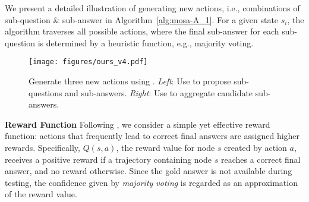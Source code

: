 We present a detailed illustration of generating new actions, i.e., combinations of sub-question \& sub-answer in Algorithm~\ref{alg:mosa-A_1}.
For a given state $s_i$,  the algorithm traverses all possible actions, where the final sub-answer for each sub-question is determined by a heuristic function, e.g., majority voting. 




\begin{figure*}[t]
\begin{center}
\centerline{\texttt{[image: figures/ours\_v4.pdf]}}
\caption{
Generate three new actions using \mosa. \emph{Left}: Use \mosa{} to propose sub-questions and sub-answers. \emph{Right}: Use \mosa{} to aggregate candidate sub-answers.
}
\label{fig:ours}
\end{center}
\vskip -0.2in
\end{figure*}





\textbf{Reward Function}
\hspace{5pt}
Following \citet{hao-etal-2023-reasoning,qi2024mutual}, we consider a simple yet effective reward function: actions that frequently lead to correct final answers are assigned higher rewards. 
Specifically, $Q(s,a)$, the reward value for node $s$ created by action $a$, receives a positive reward if a trajectory containing node $s$ reaches a correct final answer, and no reward otherwise. 
Since the gold answer is not available during testing, the confidence given by \emph{majority voting} is regarded as an approximation of the reward value.


